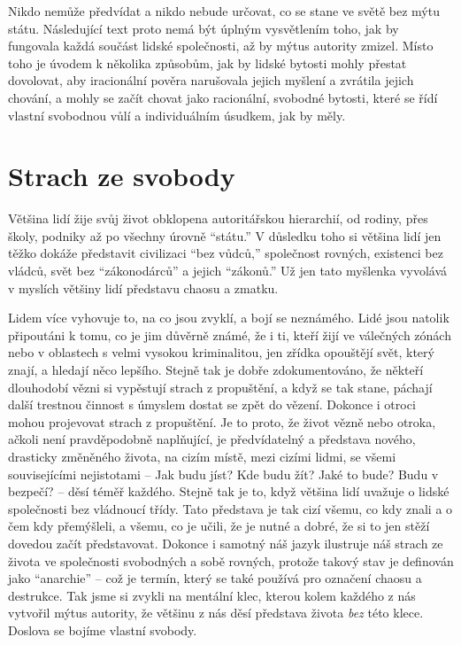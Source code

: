 \documentclass{book}
\begin{document}
Nikdo nemůže předvídat a nikdo nebude určovat, co se stane ve světě bez mýtu státu. Následující text proto nemá být úplným vysvětlením toho, jak by fungovala každá součást lidské společnosti, až by mýtus autority zmizel. Místo toho je úvodem k několika způsobům, jak by lidské bytosti mohly přestat dovolovat, aby iracionální pověra narušovala jejich myšlení a zvrátila jejich chování, a mohly se začít chovat jako racionální, svobodné bytosti, které se řídí vlastní svobodnou vůlí a individuálním úsudkem, jak by měly.

\section{Strach ze svobody}

Většina lidí žije svůj život obklopena autoritářskou hierarchií, od rodiny, přes školy, podniky až po všechny úrovně \enquote{státu.} V důsledku toho si většina lidí jen těžko dokáže představit civilizaci \enquote{bez vůdců,} společnost rovných, existenci bez vládců, svět bez \enquote{zákonodárců} a jejich \enquote{zákonů.} Už jen tato myšlenka vyvolává v myslích většiny lidí představu chaosu a zmatku.

Lidem více vyhovuje to, na co jsou zvyklí, a bojí se neznámého. Lidé jsou natolik připoutáni k tomu, co je jim důvěrně známé, že i ti, kteří žijí ve válečných zónách nebo v oblastech s velmi vysokou kriminalitou, jen zřídka opouštějí svět, který znají, a hledají něco lepšího. Stejně tak je dobře zdokumentováno, že někteří dlouhodobí vězni si vypěstují strach z propuštění, a když se tak stane, páchají další trestnou činnost s úmyslem dostat se zpět do vězení. Dokonce i otroci mohou projevovat strach z propuštění. Je to proto, že život vězně nebo otroka, ačkoli není pravděpodobně naplňující, je předvídatelný a představa nového, drasticky změněného života, na cizím místě, mezi cizími lidmi, se všemi souvisejícími nejistotami -- Jak budu jíst? Kde budu žít? Jaké to bude? Budu v bezpečí? -- děsí téměř každého. Stejně tak je to, když většina lidí uvažuje o lidské společnosti bez vládnoucí třídy. Tato představa je tak cizí všemu, co kdy znali a o čem kdy přemýšleli, a všemu, co je učili, že je nutné a dobré, že si to jen stěží dovedou začít představovat. Dokonce i samotný náš jazyk ilustruje náš strach ze života ve společnosti svobodných a sobě rovných, protože takový stav je definován jako \enquote{anarchie} -- což je termín, který se také používá pro označení chaosu a destrukce. Tak jsme si zvykli na mentální klec, kterou kolem každého z nás vytvořil mýtus autority, že většinu z nás děsí představa života \emph{bez} této klece. Doslova se bojíme vlastní svobody.
\end{document}
